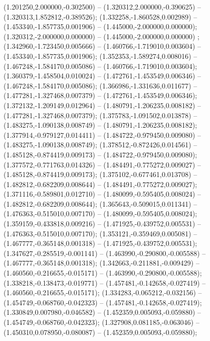  (1.201250,2.000000,-0.302500) -- (1.320312,2.000000,-0.390625) -- (1.320313,1.852812,-0.389526);
 (1.332258,-1.860528,0.002989) -- (1.453340,-1.857735,0.001906) -- (1.445000,-2.000000,0.000000);
 (1.320312,-2.000000,0.000000) -- (1.445000,-2.000000,0.000000) ;
 (1.342960,-1.723450,0.005666) -- (1.460766,-1.719010,0.003604) -- (1.453340,-1.857735,0.001906);
 (1.352353,-1.589274,0.008016) -- (1.467248,-1.584170,0.005086) -- (1.460766,-1.719010,0.003604);
 (1.360379,-1.458504,0.010024) -- (1.472761,-1.453549,0.006346) -- (1.467248,-1.584170,0.005086);
 (1.366986,-1.331636,0.011677) -- (1.477281,-1.327468,0.007379) -- (1.472761,-1.453549,0.006346);
 (1.372132,-1.209149,0.012964) -- (1.480791,-1.206235,0.008182) -- (1.477281,-1.327468,0.007379);
 (1.375783,-1.091502,0.013878) -- (1.483275,-1.090138,0.008749) -- (1.480791,-1.206235,0.008182);
 (1.377914,-0.979127,0.014411) -- (1.484722,-0.979450,0.009080) -- (1.483275,-1.090138,0.008749);
 (1.378512,-0.872426,0.014561) -- (1.485128,-0.874419,0.009173) -- (1.484722,-0.979450,0.009080);
 (1.377572,-0.771763,0.014326) -- (1.484491,-0.775272,0.009027) -- (1.485128,-0.874419,0.009173);
 (1.375102,-0.677461,0.013708) -- (1.482812,-0.682209,0.008644) -- (1.484491,-0.775272,0.009027);
 (1.371116,-0.589801,0.012710) -- (1.480099,-0.595405,0.008024) -- (1.482812,-0.682209,0.008644);
 (1.365643,-0.509015,0.011341) -- (1.476363,-0.515010,0.007170) -- (1.480099,-0.595405,0.008024);
 (1.359159,-0.433818,0.009216) -- (1.471925,-0.439752,0.005531) -- (1.476363,-0.515010,0.007170);
 (1.353121,-0.359469,0.005081) -- (1.467777,-0.365148,0.001318) -- (1.471925,-0.439752,0.005531);
 (1.347627,-0.285519,-0.001141) -- (1.463990,-0.290800,-0.005588) -- (1.467777,-0.365148,0.001318);
 (1.342663,-0.211881,-0.009429) -- (1.460560,-0.216655,-0.015171) -- (1.463990,-0.290800,-0.005588);
 (1.338218,-0.138473,-0.019771) -- (1.457481,-0.142658,-0.027419) -- (1.460560,-0.216655,-0.015171);
 (1.334283,-0.065212,-0.032156) -- (1.454749,-0.068760,-0.042323) -- (1.457481,-0.142658,-0.027419);
 (1.330849,0.007980,-0.046582) -- (1.452359,0.005093,-0.059880) -- (1.454749,-0.068760,-0.042323);
 (1.327908,0.081185,-0.063046) -- (1.450310,0.078950,-0.080087) -- (1.452359,0.005093,-0.059880);
